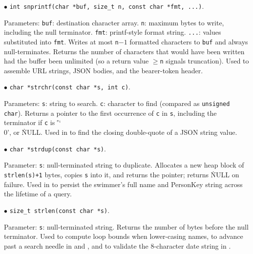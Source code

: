 \item{$\bullet$} {\tt int snprintf(char *buf, size\_t n, const char *fmt,
...)}.
\par\noindent Parameters:
\itemitem{--} {\tt buf}: destination character array.
\itemitem{--} {\tt n}: maximum bytes to write, including the null terminator.
\itemitem{--} {\tt fmt}: printf-style format string.
\itemitem{--} {\tt ...}: values substituted into {\tt fmt}.
Writes at most {\tt n}$-1$ formatted characters to {\tt buf} and
always null-terminates.  Returns the number of characters that would
have been written had the buffer been unlimited (so a return value
$\ge${\tt n} signals truncation).
Used to assemble URL strings, JSON bodies, and the bearer-token header.

\item{$\bullet$} {\tt char *strchr(const char *s, int c)}.
\par\noindent Parameters:
\itemitem{--} {\tt s}: string to search.
\itemitem{--} {\tt c}: character to find (compared as {\tt unsigned char}).
Returns a pointer to the first occurrence of {\tt c} in {\tt s},
including the terminator if {\tt c} is \.{'\char`\\0'}, or \.{NULL}.
Used in  to find the closing double-quote of a JSON
string value.

\item{$\bullet$} {\tt char *strdup(const char *s)}.
\par\noindent Parameter:
\itemitem{--} {\tt s}: null-terminated string to duplicate.
Allocates a new heap block of {\tt strlen(s)+1} bytes, copies
{\tt s} into it, and returns the pointer; returns \.{NULL} on failure.
Used in  to persist the swimmer's full name and
PersonKey string across the lifetime of a query.

\item{$\bullet$} {\tt size\_t strlen(const char *s)}.
\par\noindent Parameter:
\itemitem{--} {\tt s}: null-terminated string.
Returns the number of bytes before the null terminator.
Used to compute loop bounds when lower-casing names, to advance
past a search needle in  and , and to
validate the 8-character date string in .

